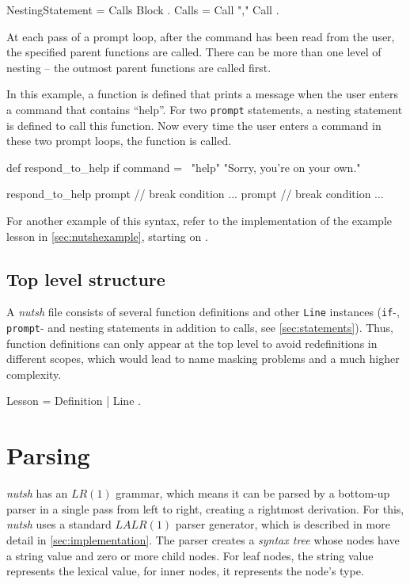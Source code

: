 \documentclass[paper=a4,twoside,abstract=on,cleardoublepage=empty,numbers=noenddot,toc=bib,toc=listof,12pt,appendixprefix=true]{scrreprt}
\begin{document}
\begin{ebnf}
NestingStatement = Calls Block .
Calls = Call { "," Call } .
\end{ebnf}
%
At each pass of a prompt loop, after the command has been read from the user, the specified parent functions are called. There can be more than one level of nesting -- the outmost parent functions are called first.

In this example, a function is defined that prints a message when the user enters a command that contains “help”. For two \texttt{prompt} statements, a nesting statement is defined to call this function. Now every time the user enters a command in these two prompt loops, the function is called.

\begin{nutsh}
def respond_to_help {
    if command =~ "help" {
        "Sorry, you're on your own."
    }
}

respond_to_help {
    prompt {
        // break condition ...
    }
    prompt {
        // break condition ...
    }
}
\end{nutsh}
%
For another example of this syntax, refer to the implementation of the example lesson in \cref{sec:nutshexample}, starting on .

\subsection{Top level structure}

A \emph{nutsh} file consists of several function definitions and other \texttt{Line} instances (\texttt{if}-, \texttt{prompt}- and nesting statements in addition to calls, see \cref{sec:statements}). Thus, function definitions can only appear at the top level to avoid redefinitions in different scopes, which would lead to name masking problems and a much higher complexity.

\begin{ebnf}
Lesson = { Definition | Line } .
\end{ebnf}

\section{Parsing}

\emph{nutsh} has an $LR(1)$ grammar, which means it can be parsed by a bottom-up parser in a single pass from left to right, creating a rightmost derivation. For this, \emph{nutsh} uses a standard $LALR(1)$ parser generator, which is described in more detail in \cref{sec:implementation}.
The parser creates a \emph{syntax tree} whose nodes have a string value and zero or more child nodes. For leaf nodes, the string value represents the lexical value, for inner nodes, it represents the node's type.
\end{document}

